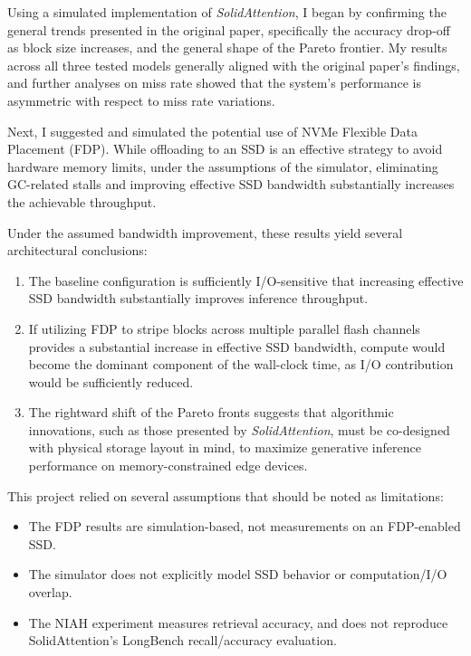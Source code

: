 \documentclass[conference]{IEEEtran}
\begin{document}
    Using a simulated implementation of \textit{SolidAttention}, I began by confirming the general trends presented in the original paper, specifically the accuracy drop-off as block size increases, and the general shape of the Pareto frontier. My results across all three tested models generally aligned with the original paper's findings, and further analyses on miss rate showed that the system's performance is asymmetric with respect to miss rate variations. 
    
    Next, I suggested and simulated the potential use of NVMe Flexible Data Placement (FDP). While offloading to an SSD is an effective strategy to avoid hardware memory limits, under the assumptions of the simulator, eliminating GC-related stalls and improving effective SSD bandwidth substantially increases the achievable throughput.

    Under the assumed bandwidth improvement, these results yield several architectural conclusions:
    \begin{enumerate}
        \item The baseline configuration is sufficiently I/O-sensitive that increasing effective SSD bandwidth substantially improves inference throughput.
        \item If utilizing FDP to stripe blocks across multiple parallel flash channels provides a substantial increase in effective SSD bandwidth, compute would become the dominant component of the wall-clock time, as I/O contribution would be sufficiently reduced.
        \item The rightward shift of the Pareto fronts suggests that algorithmic innovations, such as those presented by \textit{SolidAttention}\cite{solidattention}, must be co-designed with physical storage layout in mind, to maximize generative inference performance on memory-constrained edge devices.
    \end{enumerate}

    This project relied on several assumptions that should be noted as limitations:
    \begin{itemize}
        \item The FDP results are simulation-based, not measurements on an FDP-enabled SSD.
        \item The simulator does not explicitly model SSD behavior or computation/I/O overlap.
        \item The NIAH experiment measures retrieval accuracy, and does not reproduce SolidAttention's LongBench recall\slash accuracy evaluation.
    \end{itemize}
\end{document}
